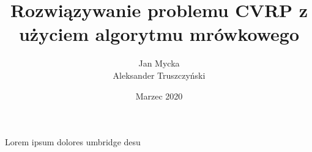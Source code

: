 \documentclass[a4paper,11pt,twoside, fleqn]{report}
\title{Rozwiązywanie problemu CVRP z użyciem algorytmu mrówkowego}
\author{Jan Mycka \\ Aleksander Truszczyński}
\date{Marzec 2020}
\begin{document}
	Lorem ipsum dolores umbridge desu
\end{document}
